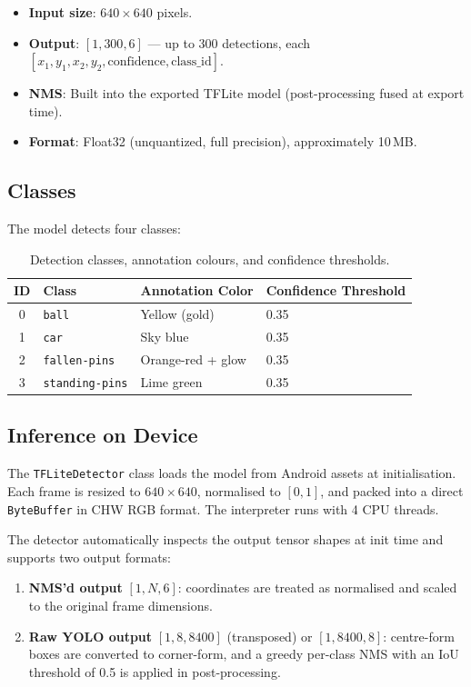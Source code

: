 \documentclass{zc-ust-hw}
\begin{document}
\begin{itemize}
    \item \textbf{Input size}: $640 \times 640$ pixels.
    \item \textbf{Output}: $[1, 300, 6]$ — up to 300 detections, each $[x_1, y_1, x_2, y_2, \text{confidence}, \text{class\_id}]$.
    \item \textbf{NMS}: Built into the exported TFLite model (post-processing fused at export time).
    \item \textbf{Format}: Float32 (unquantized, full precision), approximately 10\,MB.
\end{itemize}

\subsection{Classes}

The model detects four classes:

\begin{table}[H]
\centering
\begin{tabular}{clll}
\toprule
\textbf{ID} & \textbf{Class} & \textbf{Annotation Color} & \textbf{Confidence Threshold} \\
\midrule
0 & \texttt{ball}           & Yellow (gold)     & 0.35 \\
1 & \texttt{car}            & Sky blue          & 0.35 \\
2 & \texttt{fallen-pins}    & Orange-red + glow & 0.35 \\
3 & \texttt{standing-pins}  & Lime green        & 0.35 \\
\bottomrule
\end{tabular}
\caption{Detection classes, annotation colours, and confidence thresholds.}
\end{table}

\subsection{Inference on Device}

The \texttt{TFLiteDetector} class loads the model from Android assets at initialisation.
Each frame is resized to $640 \times 640$, normalised to $[0, 1]$, and packed into a direct \texttt{ByteBuffer} in CHW RGB format.
The interpreter runs with 4 CPU threads.

The detector automatically inspects the output tensor shapes at init time and supports two output formats:

\begin{enumerate}
    \item \textbf{NMS'd output} $[1, N, 6]$: coordinates are treated as normalised and scaled to the original frame dimensions.
    \item \textbf{Raw YOLO output} $[1, 8, 8400]$ (transposed) or $[1, 8400, 8]$: centre-form boxes are converted to corner-form, and a greedy per-class NMS with an IoU threshold of 0.5 is applied in post-processing.
\end{enumerate}
\end{document}
